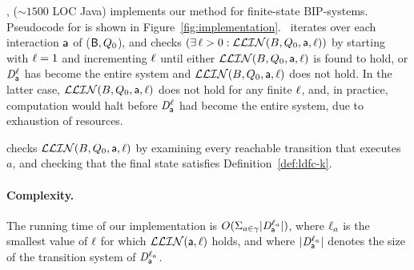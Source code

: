 
\ldfctool, ($\sim 1500$ LOC Java) implements our method for finite-state BIP-systems.
Pseudocode for \ldfctool is shown in Figure~\ref{fig:implementation}.
%
\ iterates over each interaction $\mathsf{a}$ of ($\mathsf{B}, Q_0$), and checks 
$(\exists\, \ell > 0: \mathcal{LLIN}(B, Q_0, \mathsf{a}, \ell))$ by starting with $\ell=1$ and incrementing $\ell$ until
either $\mathcal{LLIN}(B, Q_0, \mathsf{a}, \ell)$ is found to hold, or 
$\mathit{D}_{\mathsf{a}}^{\ell}$ has become the entire system and $\mathcal{LLIN}(B, Q_0, \mathsf{a}, \ell)$ does not hold. In the latter case, 
$\mathcal{LLIN}(B, Q_0, \mathsf{a}, \ell)$ does not hold for any finite $\ell$, and, in practice, 
computation would halt 
before $\mathit{D}_{\mathsf{a}}^{\ell}$ had become the entire system, due to exhaustion of resources.

 checks $\mathcal{LLIN}(B, Q_0, \mathsf{a}, \ell)$ by examining every reachable transition
that executes $a$, and checking that the final state satisfies
Definition~\ref{def:ldfc-k}. 


\paragraph{Complexity.} The running  time of our implementation is 
$O(\Sigma_{a \in \gamma} |\mathit{D}_{\mathsf{a}}^{\ell_a}|)$, where $\ell_a$ is the smallest value
of $\ell$ for which $\mathcal{LLIN}(\mathsf{a}, \ell)$ holds, and where
$|\mathit{D}_{\mathsf{a}}^{\ell_a}|$ denotes the size of the transition system of $\mathit{D}_{\mathsf{a}}^{\ell_a}$.





